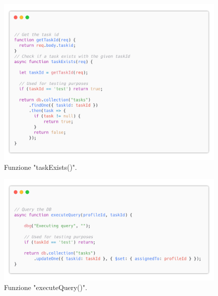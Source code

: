 \documentclass{report}
\begin{document}
\begin{figure}[H]
	\centering\includegraphics[width=1\textwidth]{images/code_task_exists.png}
	Funzione "taskExists()".
\end{figure}
\begin{figure}[H]
	\centering\includegraphics[width=1\textwidth]{images/code_scegli_task_query.png}
	Funzione "executeQuery()".
\end{figure}
\end{document}
